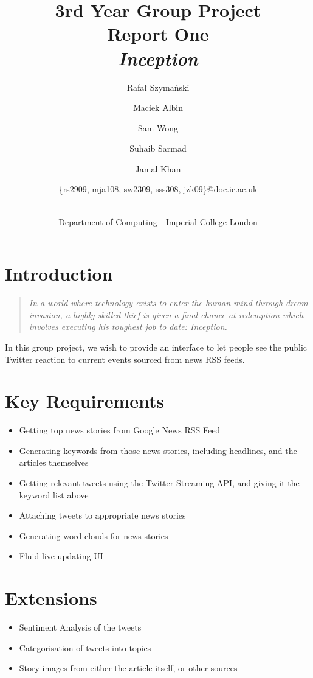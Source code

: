 \documentclass[a4paper,11pt]{article}
\title{3rd Year Group Project\\Report One\\\emph{Inception}}
\author{
    \small{Rafał Szymański}\\
  	\and
    \small{Maciek Albin}\\
    \and
    \small{Sam Wong}\\
    \and
    \small{Suhaib Sarmad}\\
		\and
		\small{Jamal Khan}\\
		\and
		\small{\{rs2909, mja108, sw2309, sss308, jzk09\}@doc.ic.ac.uk}
		\and
		\\Department of Computing - Imperial College London
}
\date{}
\begin{document}
 
	\maketitle
	
	\section{Introduction}
	
	\begin{quote}
\emph{In a world where technology exists to enter the human mind through dream invasion, a highly skilled thief is given a final chance at redemption which involves executing his toughest job to date: Inception.}	\end{quote}

	In this group project, we wish to provide an interface to let people see the public Twitter reaction to current events sourced from news RSS feeds.

	
	\section{Key Requirements}
		
		\begin{itemize}
			\item Getting top news stories from Google News RSS Feed
			\item Generating keywords from those news stories, including headlines, and the articles themselves
			\item Getting relevant tweets using the Twitter Streaming API, and giving it the keyword list above
			\item Attaching tweets to appropriate news stories
			\item Generating word clouds for news stories
			\item Fluid live updating UI
		\end{itemize}
		
	\section{Extensions}
	
		\begin{itemize}
			\item Sentiment Analysis of the tweets
			\item Categorisation of tweets into topics
			\item Story images from either the article itself, or other sources
		\end{itemize}
	
\end{document}
